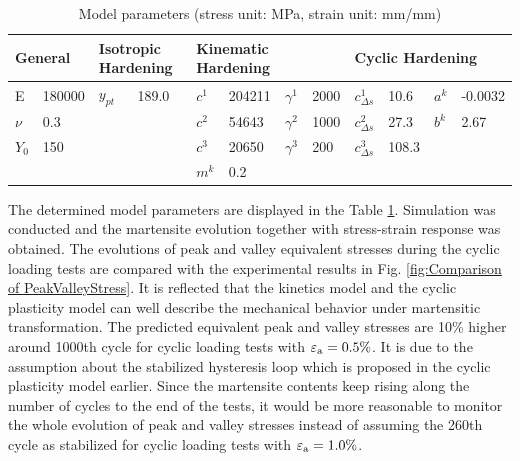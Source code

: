 \documentclass[preprint,5p,twocolumn,10pt,sort&compress]{elsarticle}
\begin{document}
\begin{table}[htbp]
\centering
\caption{Model parameters (stress unit: MPa, strain unit: mm/mm)}
\begin{tabular}{llllllllllll}
\hline
\multicolumn{2}{l}{General} & \multicolumn{2}{l}{Isotropic Hardening} & \multicolumn{4}{l}{Kinematic Hardening} & \multicolumn{4}{l}{Cyclic Hardening} \\ \hline
E               & 180000 & $y_{pt}$ & 189.0       & $c^{1}$  & 204211    & $\gamma^{1}$ & 2000      & $c_{\Delta s}^{1}$                  & 10.6 & $a^{k}$ & -0.0032 \\
$\nu$        & 0.3        &                 &                 & $c^{2}$  & 54643      & $\gamma^{2}$ & 1000      & $c_{\Delta s}^{2}$                  & 27.3 & $b^{k}$ & 2.67 \\
$Y_{0}$   & 150       &                 &                 & $c^{3}$  & 20650      & $\gamma^{3}$ & 200        & $c_{\Delta s}^{3}$                  & 108.3 \\
                 &              &                 &                 & $m^{k}$ &0.2            &                            &               &                                                   &      &              & \\ \hline
\end{tabular}
\label{tab:Model Parameters}
\end{table}

The determined model parameters are displayed in the Table \ref{tab:Model Parameters}.
Simulation was conducted and the martensite evolution together with stress-strain response was obtained. The evolutions of peak and valley equivalent stresses during the cyclic loading tests are compared with the experimental results in Fig. \ref{fig:Comparison of PeakValleyStress}. It is reflected that the kinetics model and the cyclic plasticity model can well describe the mechanical behavior under martensitic transformation. The predicted equivalent peak and valley stresses are 10\% higher around 1000th cycle for cyclic loading tests with $\varepsilon _{\rm a}=0.5\%$. It is due to the assumption about the stabilized hysteresis loop which is proposed in the cyclic plasticity model earlier. Since the martensite contents keep rising along the number of cycles to the end of the tests, it would be more reasonable to monitor the whole evolution of peak and valley stresses instead of assuming the 260th cycle as stabilized for cyclic loading tests with $\varepsilon _{\rm a}=1.0\%$.
\end{document}
